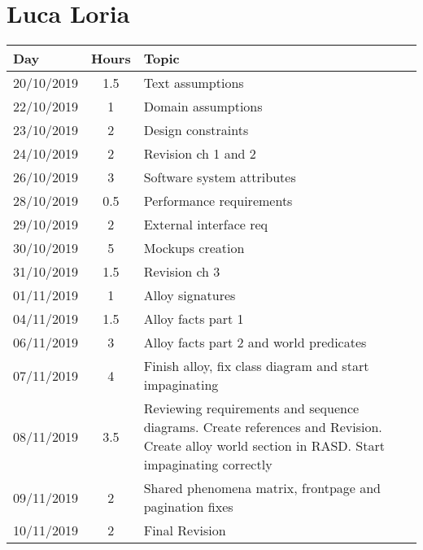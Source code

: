 \section{Luca Loria}
\begin{table}[H]
    \centering
    \begin{tabularx}{\textwidth}{ |l|c|X| }
        \hline
        Day & Hours & Topic \\
        \hline
        20/10/2019 & 1.5 & Text assumptions \\								
        \hline
        22/10/2019 & 1	& Domain assumptions \\
        \hline
        23/10/2019 & 2	& Design constraints \\
        \hline								
        24/10/2019 & 2	& Revision ch 1 and 2 \\									
        \hline
        26/10/2019 & 3 & Software system attributes \\									
        \hline
        28/10/2019 & 0.5 & Performance requirements \\									
        \hline
        29/10/2019 & 2	& External interface req \\									
        \hline
        30/10/2019 & 5 & Mockups creation \\									
        \hline
        31/10/2019 & 1.5 & Revision ch 3 \\									
        \hline
        01/11/2019 & 1 & Alloy signatures \\									
        \hline
        04/11/2019 & 1.5 & Alloy facts part 1 \\									
        \hline
        06/11/2019 & 3 & Alloy facts part 2 and world predicates \\						
        \hline
        07/11/2019 & 4 & Finish alloy, fix class diagram and start impaginating \\		
        \hline
        08/11/2019 & 3.5 & Reviewing requirements and sequence diagrams. Create references and Revision. Create alloy world section in RASD. Start impaginating correctly	\\
        \hline
        09/11/2019 & 2 & Shared phenomena matrix, frontpage and pagination fixes \\
        \hline	
        10/11/2019 & 2 & Final Revision \\
        \hline							
    \end{tabularx}
  \end{table}
